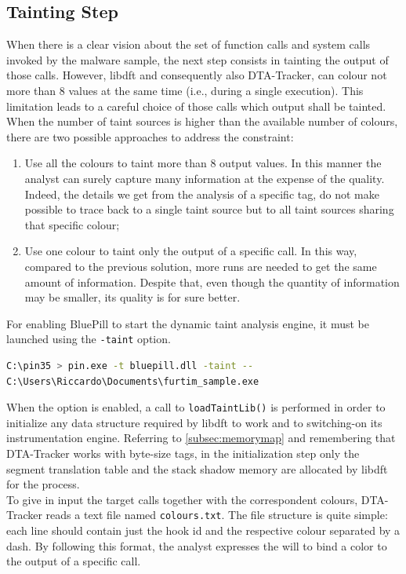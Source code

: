 \documentclass[LaM,binding=0.6cm]{sapthesis}
\begin{document}
\subsection{Tainting Step}
\label{subsec:taintingstep}
When there is a clear vision about the set of function calls and system calls invoked by the malware sample, the next step consists in tainting the output of those calls. However, libdft and consequently also DTA-Tracker, can colour not more than $8$ values at the same time (i.e., during a single execution). This limitation leads to a careful choice of those calls which output shall be tainted. When the number of taint sources is higher than the available number of colours, there are two possible approaches to address the constraint:
\begin{enumerate}
\item Use all the colours to taint more than $8$ output values. In this manner the analyst can surely capture many information at the expense of the quality. Indeed, the details we get from the analysis of a specific tag, do not make possible to trace back to a single taint source but to all taint sources sharing that specific colour;
\item Use one colour to taint only the output of a specific call. In this way, compared to the previous solution, more runs are needed to get the same amount of information. Despite that, even though the quantity of information may be smaller, its quality is for sure better.
\end{enumerate}
For enabling BluePill to start the dynamic taint analysis engine, it must be launched using the \texttt{-taint} option.
\begin{lstlisting}[language=bash]
C:\pin35 > pin.exe -t bluepill.dll -taint -- 
C:\Users\Riccardo\Documents\furtim_sample.exe
\end{lstlisting}
When the option is enabled, a call to \texttt{loadTaintLib()} is performed in order to initialize any data structure required by libdft to work and to switching-on its instrumentation engine. Referring to \autoref{subsec:memorymap} and remembering that DTA-Tracker works with byte-size tags, in the initialization step only the segment translation table and the stack shadow memory are allocated by libdft for the process.\\

To give in input the target calls together with the correspondent colours, DTA-Tracker reads a text file named \texttt{colours.txt}. The file structure is quite simple: each line should contain just the hook id and the respective colour separated by a dash. By following this format, the analyst expresses the will to bind a color to the output of a specific call.\\
\end{document}
